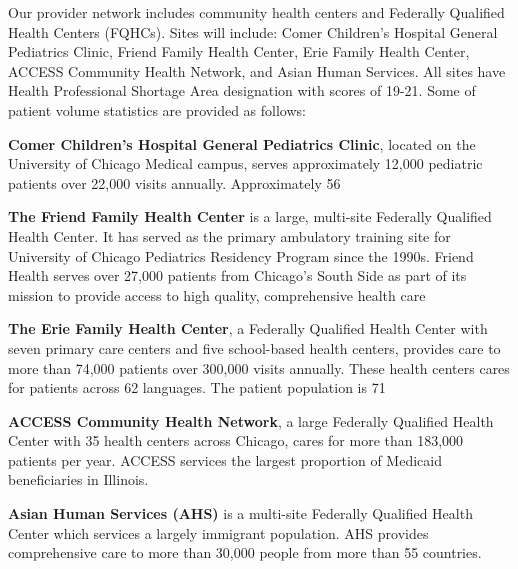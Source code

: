 Our provider network includes community health centers and Federally Qualified Health Centers (FQHCs). Sites will include: Comer Children’s Hospital General Pediatrics Clinic, Friend Family Health Center, Erie Family Health Center, ACCESS Community Health Network, and Asian Human Services. All sites have Health Professional Shortage Area designation with scores of 19-21. Some of patient volume statistics are provided as follows:

\textbf{Comer Children's Hospital General Pediatrics Clinic}, located on the University of Chicago Medical campus, serves approximately 12,000 pediatric patients over 22,000 visits annually. Approximately 56%

\textbf{The Friend Family Health Center} is a large, multi-site Federally Qualified Health Center.   It has served as the primary ambulatory training site for University of Chicago Pediatrics Residency Program since the 1990s.  Friend Health serves over 27,000 patients from Chicago's South Side as part of its mission to provide access to high quality, comprehensive health care   

\textbf{The Erie Family Health Center}, a Federally Qualified Health Center with seven primary care centers and five school-based health centers, provides care to more than 74,000 patients over 300,000 visits annually. These health centers cares for patients across 62 languages. The patient population is 71%

\textbf{ACCESS Community Health Network}, a large Federally Qualified Health Center with 35 health centers across Chicago, cares for more than 183,000 patients per year. ACCESS services the largest proportion of Medicaid beneficiaries in Illinois.  

\textbf{Asian Human Services (AHS)} is a multi-site Federally Qualified Health Center which services a largely immigrant population. AHS provides comprehensive care to more than 30,000 people from more than 55 countries.


